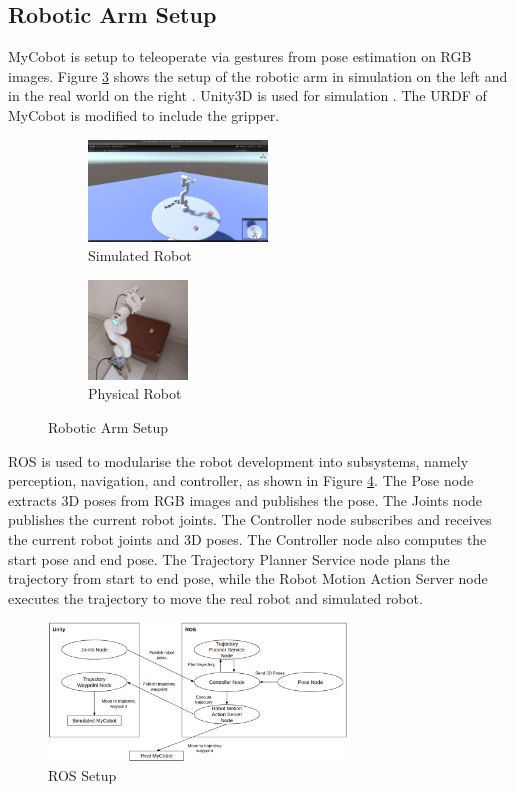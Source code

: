 \newpage
\subsection{Robotic Arm Setup}
\noindent
MyCobot is setup to teleoperate via gestures from pose estimation on RGB images. Figure \ref{fig:robotic_arm_setup} shows the setup of the robotic arm in simulation on the left and in the real world on the right \cite{mycobot}. Unity3D is used for simulation \cite{unity3d}. The URDF of MyCobot is modified to include the gripper.

\begin{figure}[ht]
    \begin{center}
        \begin{subfigure}[b]{0.40\textwidth}
            \includegraphics[width=180px]{assets/simulation_robot.png}
            \caption{Simulated Robot}
            \label{fig:simulated_robot}
        \end{subfigure}
        \begin{subfigure}[b]{0.22\textwidth}
            \includegraphics[width=100px]{assets/physical_robot.jpg}
            \caption{Physical Robot}
            \label{fig:physical_robot}
        \end{subfigure}
	    \caption{Robotic Arm Setup}
	    \label{fig:robotic_arm_setup}        
    \end{center}
\end{figure}
\noindent
ROS is used to modularise the robot development into subsystems, namely perception, navigation, and controller, as shown in Figure \ref{fig:ros_setup}. The Pose node extracts 3D poses from RGB images and publishes the pose. The Joints node publishes the current robot joints. The Controller node subscribes and receives the current robot joints and 3D poses. The Controller node also computes the start pose and end pose. The Trajectory Planner Service node plans the trajectory from start to end pose, while the Robot Motion Action Server node executes the trajectory to move the real robot and simulated robot.

\begin{figure}[ht]
	\begin{center}
		\includegraphics[width=300px]{assets/ros_setup.png}
		\caption{ROS Setup}
		\label{fig:ros_setup}
	\end{center}
\end{figure}
